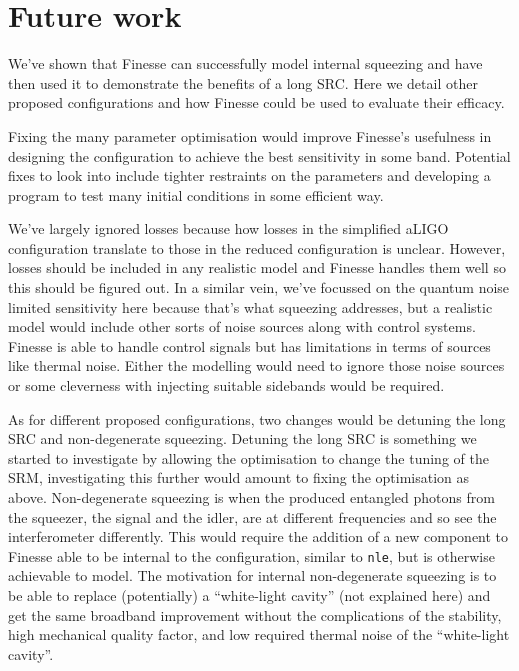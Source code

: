 \documentclass[aps,pra,superscriptaddress,reprint,nofootinbib]{revtex4-1}
\newcommand{\code}[1]{\texttt{#1}}
\begin{document}
\section{Future work}
\label{sec:future_work}

We’ve shown that Finesse can successfully model internal squeezing and have then used it to demonstrate the benefits of a long SRC. Here we detail other proposed configurations and how Finesse could be used to evaluate their efficacy.


Fixing the many parameter optimisation would improve Finesse’s usefulness in designing the configuration to achieve the best sensitivity in some band. Potential fixes to look into include tighter restraints on the parameters and developing a program to test many initial conditions in some efficient way.


We’ve largely ignored losses because how losses in the simplified aLIGO configuration translate to those in the reduced configuration is unclear. However, losses should be included in any realistic model and Finesse handles them well so this should be figured out. In a similar vein, we’ve focussed on the quantum noise limited sensitivity here because that’s what squeezing addresses, but a realistic model would include other sorts of noise sources along with control systems. Finesse is able to handle control signals but has limitations in terms of sources like thermal noise. Either the modelling would need to ignore those noise sources or some cleverness with injecting suitable sidebands would be required.


As for different proposed configurations, two changes would be detuning the long SRC and non-degenerate squeezing. Detuning the long SRC is something we started to investigate by allowing the optimisation to change the tuning of the SRM, investigating this further would amount to fixing the optimisation as above. Non-degenerate squeezing is when the produced entangled photons from the squeezer, the signal and the idler, are at different frequencies and so see the interferometer differently. This would require the addition of a new component to Finesse able to be internal to the configuration, similar to \code{nle}, but is otherwise achievable to model. The motivation for internal non-degenerate squeezing is to be able to replace (potentially) a ``white-light cavity'' (not explained here) and get the same broadband improvement without the complications of the stability, high mechanical quality factor, and low required thermal noise of the ``white-light cavity''.
\end{document}

